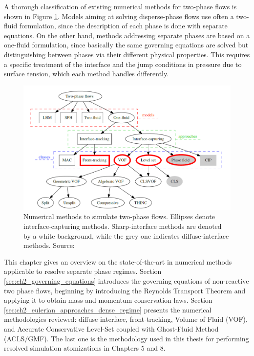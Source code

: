A thorough classification of existing numerical methods for two-phase flows is shown in Figure \ref{fig:classification_numerical_methods_mirjalili}. Models aiming at solving disperse-phase flows use often a two-fluid formulation, since the description of each phase is done with separate equations. On the other hand, methods addressing separate phases are based on a one-fluid formulation, since basically the same governing equations are solved but distinguishing between phases via their different physical properties. This requires a specific treatment of the interface and the jump conditions in pressure due to surface tension, which each method handles differently. 

\begin{figure}[h!]
	\centering
	\includegraphics[scale=1.0]{./part1_numerical_approaches/figures_ch2/classification_numerical_methods_mirjalili}
	\caption[Numerical methods to simulate two-phase flows.]{Numerical methods to simulate two-phase flows. Ellipses denote interface-capturing methods. Sharp-interface methods are denoted by a white background, while the grey one indicates diffuse-interface methods. Source: }
	\label{fig:classification_numerical_methods_mirjalili}
\end{figure}
	
This chapter gives an overview on the state-of-the-art in numerical methods applicable to resolve separate phase regimes. Section \ref{sec:ch2_governing_equations} introduces the governing equations of non-reactive two phase flows, beginning by introducing the Reynolds Transport Theorem and applying it to obtain mass and momentum conservation laws. Section \ref{sec:ch2_eulerian_approaches_dense_regime} presents the numerical methodologies reviewed: diffuse interface, front-tracking, Volume of Fluid (VOF), and Accurate Conservative Level-Set coupled with Ghost-Fluid Method (ACLS/GMF). The last one is the methodology used in this thesis for performing resolved simulation atomizations in Chapters 5 and 8.%


